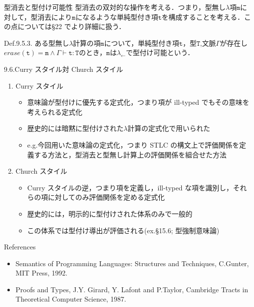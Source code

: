 \documentclass[9pt]{beamer}
\begin{document}
\begin{frame}{型消去と型付け可能性}
型消去の双対的な操作を考える．つまり，型無し$\lambda$項$\mathtt{m}$に対して，型消去により$\mathtt{m}$になるような単純型付き項$\mathtt{t}$を構成することを考える．この点については\S22 でより詳細に扱う．
\begin{alertblock}{Def.9.5.3.}
ある型無し$\lambda$計算の項$\mathtt{m}$について，単純型付き項$\mathtt{t}$，型$\mathtt{T}$,文脈$\Gamma$が存在し$erase(\mathtt{t}) = \mathtt{m}\land \Gamma\vdash\mathtt{t:T}$のとき，$\mathtt{m}$は$\lambda_{\leftarrow}$で型付け可能という．
\end{alertblock}
\end{frame}
\begin{frame}{9.6.Curry スタイル対 Church スタイル}
\begin{enumerate}
\item Curry スタイル\begin{itemize}
\item 意味論が型付けに優先する定式化，つまり項が ill-typed でもその意味を考えられる定式化
\item 歴史的には暗黙に型付けされた$\lambda$計算の定式化で用いられた
\item e.g.今回用いた意味論の定式化，つまり STLC の構文上で評価関係を定義する方法と，型消去と型無し計算上の評価関係を組合せた方法
\end{itemize}
\item Church スタイル\begin{itemize}
\item Curry スタイルの逆，つまり項を定義し，ill-typed な項を識別し，それらの項に対してのみ評価関係を定める定式化
\item 歴史的には，明示的に型付けされた体系のみで一般的
\item この体系では型付け導出が評価される(ex.\S15.6; 型強制意味論)
\end{itemize}
\end{enumerate}
\end{frame}
\begin{frame}{References}
	\begin{itemize}
		\item Semantics of Programming Languages: Structures and Techniques, C.Gunter, MIT Press, 1992.
		\item Proofs and Types, J.Y. Girard, Y. Lafont and P.Taylor, Cambridge Tracts in Theoretical Computer Science, 1987.
	\end{itemize}
\end{frame}
\end{document}
